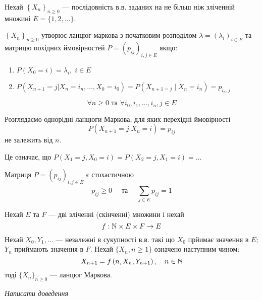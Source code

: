 
Нехай $\left\{ X_n \right\}_{n \geq 0} $ --- послідовність в.в. заданих на не більш ніж зліченній
множині $E = \{1, 2, \ldots\} $.

\begin{definition}
  $\left\{ X_n \right\}_{n \geq 0} $ утворює ланцюг маркова з початковим розподілом
  $\lambda = \left( \lambda_i \right)_{i \in  E}$ та матрицю похідних ймовірностей
  $P = \left( p_{ij} \right)_{i,j \in  E} $ якщо:
  \begin{enumerate}
    \item $P\left( X_0 = i \right) = \lambda_i, \; i \in  E$
  \item $P\left( X_{n+1} = j | X_n = i_n, \ldots, X_0 = i_0 \right) =
    P\left( X_{n+1 = j} \mid X_n = i_n\right) = p_{i_n,j} $
  \end{enumerate}
  \[ \forall n \geq 0 \text{ та } \forall i_0, i_1, \ldots, i_n , j \in E \] 
\end{definition}

\begin{remark}
  Розглядаємо однорідні ланцюги Маркова, для яких перехідні ймовірності
  \[ P\left( X_{n+1} = j | X_n = i \right) = p_{ij} \] 
  не залежить від $n$.

  Це означає, що $P\left( X_1 = j, X_0 = i \right) = P\left( X_2 = j, X_1 = i \right) = \ldots $
\end{remark}

Матриця $P = \left( p_{ij} \right)_{i,j \in  E} $ є стохастичною
\[ p_{ij} \geq 0 \quad \text{ та } \quad \sum_{j \in  E}^{} p_{ij} = 1 \] 


\begin{lemma}
  Нехай $E$ та $F$ --- дві зліченні (скінченні) множини і
  нехай
   \[ f: \mathbb{N} \times E \times F \to  E \] 
  Нехай $X_0, Y_1, \ldots$ --- незалежні в сукупності в.в. такі що
  $X_0$ прйимає значення в $E$;  $Y_n$ приймають значення в  $F$.
  Нехай  $\{X_n, n\geq 1\}$ означено наступним чином:
  \[ X_{n+1} = f\left( n ,X_n, Y_{n+1} \right), \quad n \in \mathbb{N}  \] 
  тоді $\{X_n\} _{n\geq 0}$ --- ланцюг Маркова.
\end{lemma}

\textit{Написати доведення}

